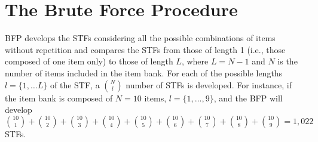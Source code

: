 \documentclass[12pt, a4paper, titilepage]{article}
\begin{document}



%
%
%
%
%
%
%

\section*{The Brute Force Procedure}

BFP develops the STFs considering all the possible  combinations of items without repetition and compares the STFs from those of length 1 (i.e., those composed of one item only) to those of length $L$, where $L = N- 1$ and $N$ is the number of items included in the item bank. For each of the possible lengths $l = \{1, \ldots L\}$ of the STF, a $\binom{N}{l}$ number of STFs is developed. 
For instance, if the item bank is composed of $N = 10$ items, $l = \{1, \ldots, 9\}$, and the BFP will develop $\binom{10}{1} + \binom{10}{2} + \binom{10}{3} + \binom{10}{4} + \binom{10}{5} + \binom{10}{6} + \binom{10}{7} + \binom{10}{8} + \binom{10}{9} = 1,022$ STFs. 
\end{document}
